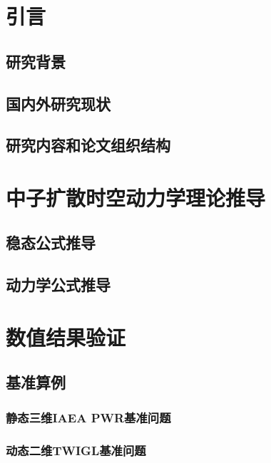 \documentclass[master,xetex]{thuthesis}
\begin{document}
\graphicspath{{figures/}}


\frontmatter


\tableofcontents

%


\mainmatter
\chapter{引言}
\section{研究背景}
\section{国内外研究现状}
\section{研究内容和论文组织结构}





\chapter{中子扩散时空动力学理论推导}
\section{稳态公式推导}
\section{动力学公式推导}

\chapter{数值结果验证}
\section{基准算例}
\subsection{静态三维IAEA PWR基准问题}
\subsection{动态二维TWIGL基准问题}
\end{document}
